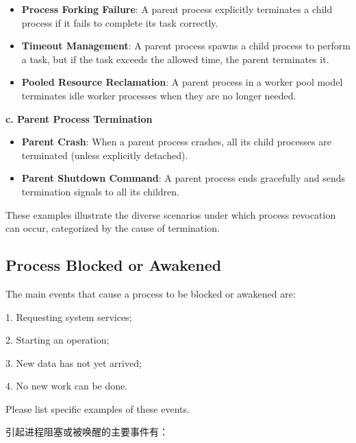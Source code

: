 \documentclass[a4paper]{book}
\begin{document}
\begin{itemize}
\item 
\textbf{Process Forking Failure}: A parent process explicitly terminates a child process if it fails to complete its task correctly.

\item 
\textbf{Timeout Management}: A parent process spawns a child process to perform a task, but if the task exceeds the allowed time, the parent terminates it.

\item 
\textbf{Pooled Resource Reclamation}: A parent process in a worker pool model terminates idle worker processes when they are no longer needed.

\end{itemize}

\textbf{c. Parent Process Termination}

\begin{itemize}
\item 
\textbf{Parent Crash}: When a parent process crashes, all its child processes are terminated (unless explicitly detached).

\item 
\textbf{Parent Shutdown Command}: A parent process ends gracefully and sends termination signals to all its children.

\end{itemize}

\hrulefill

These examples illustrate the diverse scenarios under which process revocation can occur, categorized by the cause of termination.

\subsection{Process Blocked or Awakened}

\begin{greenbox}
The main events that cause a process to be blocked or awakened are:

1. Requesting system services;

2. Starting an operation;

3. New data has not yet arrived;

4. No new work can be done.

Please list specific examples of these events.
\end{greenbox}

引起进程阻塞或被唤醒的主要事件有：
\end{document}
